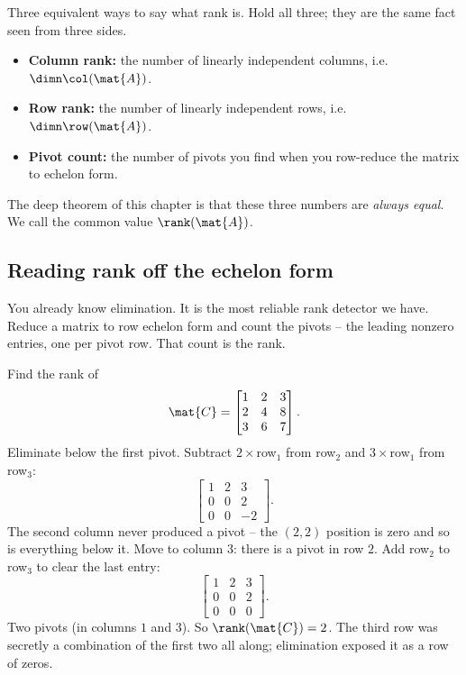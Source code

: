 \begin{focusbox}
Three equivalent ways to say what rank is. Hold all three; they are the same
fact seen from three sides.
\begin{itemize}
  \item \textbf{Column rank:} the number of linearly independent columns, i.e.
        $\dimn \col(\mat{A})$.
  \item \textbf{Row rank:} the number of linearly independent rows, i.e.
        $\dimn \row(\mat{A})$.
  \item \textbf{Pivot count:} the number of pivots you find when you row-reduce
        the matrix to echelon form.
\end{itemize}
The deep theorem of this chapter is that these three numbers are \emph{always
equal}. We call the common value $\rank(\mat{A})$.
\end{focusbox}

\subsection{Reading rank off the echelon form}

You already know elimination. It is the most reliable rank detector we have.
Reduce a matrix to row echelon form and count the pivots -- the leading nonzero
entries, one per pivot row. That count is the rank.

\begin{example}\label{ch16:pivot-count}
Find the rank of
\[
  \mat{C} = \begin{bmatrix} 1 & 2 & 3 \\ 2 & 4 & 8 \\ 3 & 6 & 7 \end{bmatrix}.
\]
Eliminate below the first pivot. Subtract $2\times$row$_1$ from row$_2$ and
$3\times$row$_1$ from row$_3$:
\[
  \begin{bmatrix} 1 & 2 & 3 \\ 0 & 0 & 2 \\ 0 & 0 & -2 \end{bmatrix}.
\]
The second column never produced a pivot -- the $(2,2)$ position is zero and so
is everything below it. Move to column $3$: there is a pivot in row $2$. Add
row$_2$ to row$_3$ to clear the last entry:
\[
  \begin{bmatrix} 1 & 2 & 3 \\ 0 & 0 & 2 \\ 0 & 0 & 0 \end{bmatrix}.
\]
Two pivots (in columns $1$ and $3$). So $\rank(\mat{C}) = 2$. The third row was
secretly a combination of the first two all along; elimination exposed it as a
row of zeros.
\end{example}

